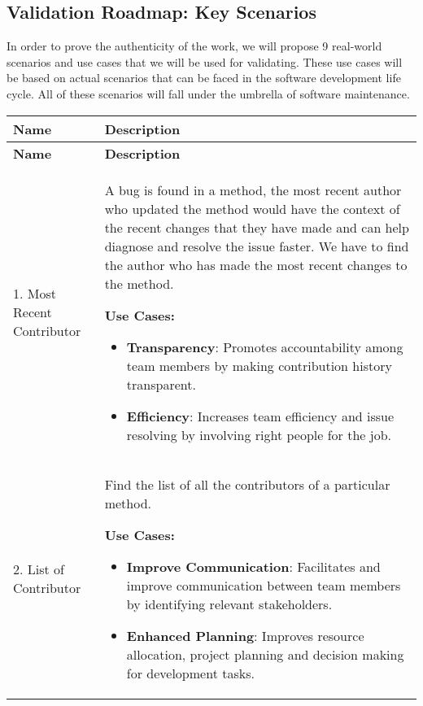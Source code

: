 \subsection{Validation Roadmap: Key Scenarios}\label{ch3:validation_roadmap}

In order to prove the authenticity of the work, we will propose 9 real-world scenarios and use cases that we will be used for validating. These use cases will be based on actual scenarios that can be faced in the software development life cycle. All of these scenarios will fall under the umbrella of software maintenance.

\vspace{1cm} 
\noindent
\begin{longtable}{|m{4cm}|m{10cm}|}
\hline
\textbf{Name} & \textbf{Description} \\ \hline
\endfirsthead
\hline
\textbf{Name} & \textbf{Description} \\ \hline
\endhead
\hline
\endfoot
\endlastfoot

1. Most Recent Contributor & A bug is found in a method, the most recent author who updated the method would have the context of the recent changes that they have made and can help diagnose and resolve the issue faster. We have to find the author who has made the most recent changes to the method.

\textbf{Use Cases:}
\begin{itemize}
	\item \textbf{Transparency}: Promotes accountability among team members by making contribution history transparent.
	\item \textbf{Efficiency}: Increases team efficiency and issue resolving by involving right people for the job.
\end{itemize}
\\ \hline

2. List of Contributor & Find the list of all the contributors of a particular method.

\textbf{Use Cases:}
\begin{itemize}
	\item \textbf{Improve Communication}: Facilitates and improve communication between team members by identifying relevant stakeholders.
	\item \textbf{Enhanced Planning}: Improves resource allocation, project planning and decision making for development tasks.
\end{itemize}
\\ \hline


\end{longtable}
